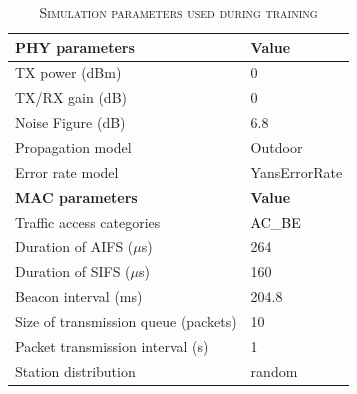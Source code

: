 \begin{table}[t]
\centering
\renewcommand{\arraystretch}{1.2}
\caption{\textsc{Simulation parameters used during training}\label{tab:ns3 parameters}}
\begin{tabular}{ll}
\hline
\textbf{PHY parameters}             & \textbf{Value}  \\
\hline
TX power (dBm)             & 0    \\
TX/RX gain (dB)                        & 0     \\
Noise Figure (dB)               & 6.8      \\  
Propagation model         & Outdoor \\ %
Error rate model               & YansErrorRate \\
\hline
\textbf{MAC parameters}               & \textbf{Value}  \\
\hline
Traffic access categories             & \textcolor{black}{ AC\_{BE} } \\
Duration of AIFS ($\mu$s)             & 264      \\
Duration of SIFS ($\mu$s)            & 160      \\
Beacon interval (ms)           & 204.8 \\
Size of transmission queue (packets)  & 10  \\
Packet transmission interval (s)        & 1  \\
Station distribution           & random  \\
\hline
\end{tabular}
\end{table}
 
